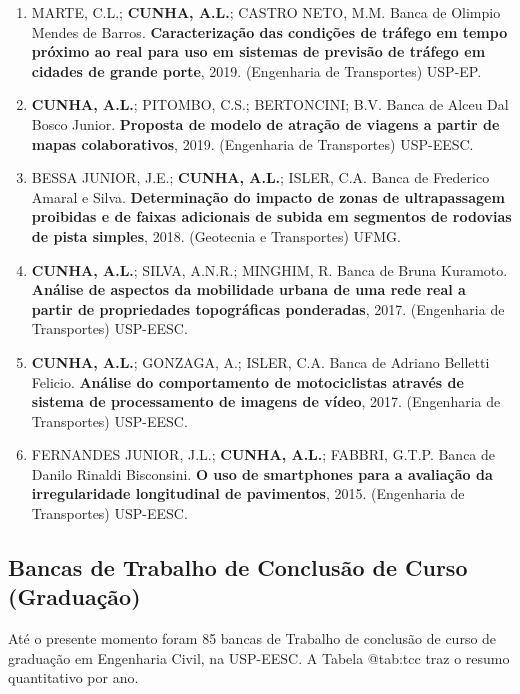 \documentclass[
  brazilian,
  11pt,
  a4paper,
]{article}
\begin{document}
\begin{enumerate}
  SILVA JUNIOR, C.A.P.; \textbf{CUNHA, A.L.}; GUERREIRO, T.C.AM. Banca
  de Thiago Vinicius Louro. \textbf{Análise dos fatores que influenciam
  na ocorrência de ultrapassagens perigosas entre veículos motorizados e
  ciclistas}, 2020. (Engenharia Civil) UEL.
\item
  MARTE, C.L.; \textbf{CUNHA, A.L.}; CASTRO NETO, M.M. Banca de Olimpio
  Mendes de Barros. \textbf{Caracterização das condições de tráfego em
  tempo próximo ao real para uso em sistemas de previsão de tráfego em
  cidades de grande porte}, 2019. (Engenharia de Transportes) USP-EP.
\item
  \textbf{CUNHA, A.L.}; PITOMBO, C.S.; BERTONCINI; B.V. Banca de Alceu
  Dal Bosco Junior. \textbf{Proposta de modelo de atração de viagens a
  partir de mapas colaborativos}, 2019. (Engenharia de Transportes)
  USP-EESC.
\item
  BESSA JUNIOR, J.E.; \textbf{CUNHA, A.L.}; ISLER, C.A. Banca de
  Frederico Amaral e Silva. \textbf{Determinação do impacto de zonas de
  ultrapassagem proibidas e de faixas adicionais de subida em segmentos
  de rodovias de pista simples}, 2018. (Geotecnia e Transportes) UFMG.
\item
  \textbf{CUNHA, A.L.}; SILVA, A.N.R.; MINGHIM, R. Banca de Bruna
  Kuramoto. \textbf{Análise de aspectos da mobilidade urbana de uma rede
  real a partir de propriedades topográficas ponderadas}, 2017.
  (Engenharia de Transportes) USP-EESC.
\item
  \textbf{CUNHA, A.L.}; GONZAGA, A.; ISLER, C.A. Banca de Adriano
  Belletti Felicio. \textbf{Análise do comportamento de motociclistas
  através de sistema de processamento de imagens de vídeo}, 2017.
  (Engenharia de Transportes) USP-EESC.
\item
  FERNANDES JUNIOR, J.L.; \textbf{CUNHA, A.L.}; FABBRI, G.T.P. Banca de
  Danilo Rinaldi Bisconsini. \textbf{O uso de smartphones para a
  avaliação da irregularidade longitudinal de pavimentos}, 2015.
  (Engenharia de Transportes) USP-EESC.
\end{enumerate}

\subsection{Bancas de Trabalho de Conclusão de Curso
(Graduação)}\label{bancas-de-trabalho-de-conclusuxe3o-de-curso-graduauxe7uxe3o}

Até o presente momento foram 85 bancas de Trabalho de conclusão de curso
de graduação em Engenharia Civil, na USP-EESC. A Tabela @tab:tcc traz o
resumo quantitativo por ano.
\end{document}
